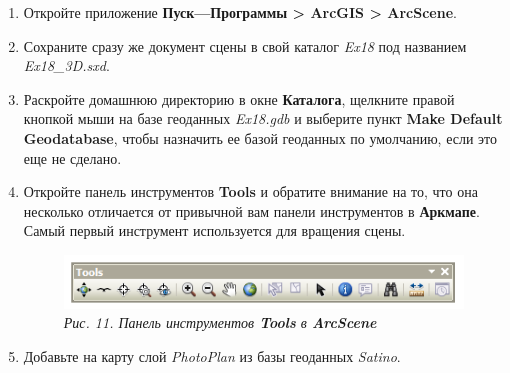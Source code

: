 \documentclass[]{book}
\theoremstyle{definition}
\theoremstyle{definition}
\theoremstyle{definition}
\theoremstyle{remark}
\begin{document}
\begin{enumerate}
\def\labelenumi{\arabic{enumi}.}
\item
  Откройте приложение \textbf{Пуск---Программы \textgreater{} ArcGIS
  \textgreater{} ArcScene}.
\item
  Сохраните сразу же документ сцены в свой каталог \emph{Ex18} под
  названием \emph{Ex18\_3D.sxd}.
\item
  Раскройте домашнюю директорию в окне \textbf{Каталога}, щелкните
  правой кнопкой мыши на базе геоданных \emph{Ex18.gdb} и выберите пункт
  \textbf{Make Default Geodatabase}, чтобы назначить ее базой геоданных
  по умолчанию, если это еще не сделано.
\item
  Откройте панель инструментов \textbf{Tools} и обратите внимание на то,
  что она несколько отличается от привычной вам панели инструментов в
  \textbf{Аркмапе}. Самый первый инструмент используется для вращения
  сцены.

  \begin{figure}
  \centering
  \includegraphics{images/Ex18/image12.png}
  \caption{\emph{Рис. 11. Панель инструментов \textbf{Tools} в
  \textbf{ArcScene} }}
  \end{figure}
\item
  Добавьте на карту слой \emph{PhotoPlan} из базы геоданных
  \emph{Satino}.


\end{enumerate}
\end{document}
